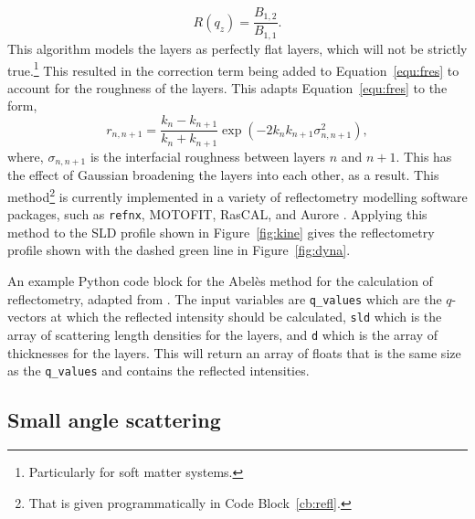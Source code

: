 %
\begin{equation}
    R(q_z) = \frac{B_{1,2}}{B_{1,1}}.
\end{equation}
%
This algorithm models the layers as perfectly flat layers, which will not be strictly true.\footnote{Particularly for soft matter systems.}
This resulted in the correction term being added to Equation~\ref{equ:fres} to account for the roughness of the layers.
This adapts Equation~\ref{equ:fres} to the form,
%
\begin{equation}
    r_{n,n+1} = \frac{k_n - k_{n+1}}{k_n + k_{n+1}}\exp{(-2k_nk_{n+1}\sigma^2_{n,n+1})},
\end{equation}
%
where, $\sigma_{n,n+1}$ is the interfacial roughness between layers $n$ and $n+1$.\autocite{nevot_caracterisation_1980}
This has the effect of Gaussian broadening the layers into each other, as a result.
This method\footnote{That is given programmatically in Code Block~\protect\ref{cb:refl}.} is currently implemented in a variety of reflectometry modelling software packages, such as \texttt{refnx}, MOTOFIT, RasCAL, and Aurore \autocite{nelson_refnx_2019,nelson_co-refinement_2006,hughes_rascal_nodate,gerelli_aurore_2016-1,gerelli_aurore_2016}.
Applying this method to the SLD profile shown in Figure~\ref{fig:kine} gives the reflectometry profile shown with the dashed green line in Figure~\ref{fig:dyna}.
%
\begin{listing}[t]
    \forcerectofloat
    \centering
    \caption{An example Python code block for the Abel\`{e}s method for the calculation of reflectometry, adapted from \cite{nelson_refnx_2019}. The input variables are \texttt{q\_values} which are the $q$-vectors at which the reflected intensity should be calculated, \texttt{sld} which is the array of scattering length densities for the layers, and \texttt{d} which is the array of thicknesses for the layers. This will return an array of floats that is the same size as the \texttt{q\_values} and contains the reflected intensities.}
    
    \label{cb:refl}
\end{listing}
%

\subsection{Small angle scattering}
\label{sec:sasanal}

